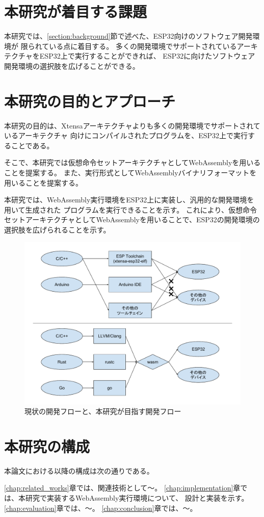 \section{本研究が着目する課題}

本研究では、\ref{section:background}節で述べた、ESP32向けのソフトウェア開発環境が
限られている点に着目する。
多くの開発環境でサポートされているアーキテクチャをESP32上で実行することができれば、
ESP32に向けたソフトウェア開発環境の選択肢を広げることができる。

\section{本研究の目的とアプローチ}

本研究の目的は、Xtensaアーキテクチャよりも多くの開発環境でサポートされているアーキテクチャ
向けにコンパイルされたプログラムを、ESP32上で実行することである。

そこで、本研究では仮想命令セットアーキテクチャとしてWebAssemblyを用いることを提案する。
また、実行形式としてWebAssemblyバイナリフォーマットを用いることを提案する。

本研究では、WebAssembly実行環境をESP32上に実装し、汎用的な開発環境を用いて生成された
プログラムを実行できることを示す。
これにより、仮想命令セットアーキテクチャとしてWebAssemblyを用いることで、ESP32の開発環境の
選択肢を広げられることを示す。

\begin{figure}[htbp]
  \caption{現状の開発フローと、本研究が目指す開発フロー}
  \label{fig:new_world}
  \begin{center}
    \includegraphics[bb=0 0 800 600,width=12cm]{img/new_world.pdf}
  \end{center}
\end{figure}

\section{本研究の構成}

本論文における以降の構成は次の通りである。

\ref{chap:related_works}章では、関連技術として〜。
\ref{chap:implementation}章では、本研究で実装するWebAssembly実行環境について、
設計と実装を示す。
\ref{chap:evaluation}章では、〜。
\ref{chap:conclusion}章では、〜。
